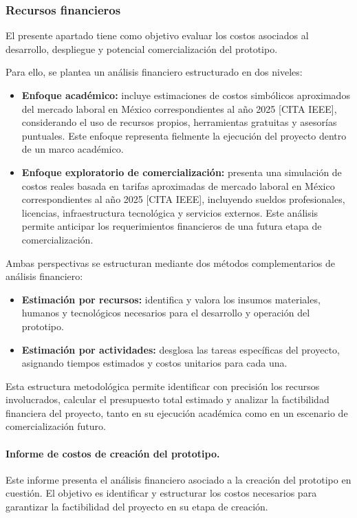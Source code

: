 \subsubsection{Recursos financieros}
El presente apartado tiene como objetivo evaluar los costos asociados al desarrollo, despliegue y potencial comercialización del prototipo. 

Para ello, se plantea un análisis financiero estructurado en dos niveles: 

\begin{itemize}
	\item \textbf{Enfoque académico:} incluye estimaciones de costos simbólicos aproximados del mercado laboral en México correspondientes al año 2025 [CITA IEEE], considerando el uso de recursos propios, herramientas gratuitas y asesorías puntuales. Este enfoque representa fielmente la ejecución del proyecto dentro de un marco académico.
	
	\item \textbf{Enfoque exploratorio de comercialización:} presenta una simulación de costos reales basada en tarifas aproximadas de mercado laboral en México correspondientes al año 2025 [CITA IEEE], incluyendo sueldos profesionales, licencias, infraestructura tecnológica y servicios externos. Este análisis permite anticipar los requerimientos financieros de una futura etapa de comercialización.
\end{itemize}

Ambas perspectivas se estructuran mediante dos métodos complementarios de análisis financiero:

\begin{itemize}
	\item \textbf{Estimación por recursos:} identifica y valora los insumos materiales, humanos y tecnológicos necesarios para el desarrollo y operación del prototipo.
	\item \textbf{Estimación por actividades:} desglosa las tareas específicas del proyecto, asignando tiempos estimados y costos unitarios para cada una.
\end{itemize}

Esta estructura metodológica permite identificar con precisión los recursos involucrados, calcular el presupuesto total estimado y analizar la factibilidad financiera del proyecto, tanto en su ejecución académica como en un escenario de comercialización futuro.

\paragraph{\textbf{Informe de costos de creación del prototipo.}} 
Este informe presenta el análisis financiero asociado a la creación del prototipo en cuestión. El objetivo es identificar y estructurar los costos necesarios para garantizar la factibilidad del proyecto en su etapa de creación.

